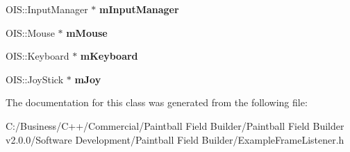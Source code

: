 \begin{DoxyCompactItemize}
\item 
\hypertarget{class_example_frame_listener_ad1263d99703452367b70e8917a3484ae}{
OIS::InputManager $\ast$ {\bfseries mInputManager}}
\label{class_example_frame_listener_ad1263d99703452367b70e8917a3484ae}

\item 
\hypertarget{class_example_frame_listener_a6cb185d298937b6da88d6032c16cc484}{
OIS::Mouse $\ast$ {\bfseries mMouse}}
\label{class_example_frame_listener_a6cb185d298937b6da88d6032c16cc484}

\item 
\hypertarget{class_example_frame_listener_a3ddc50f261d1ef5e42637b2196e24d77}{
OIS::Keyboard $\ast$ {\bfseries mKeyboard}}
\label{class_example_frame_listener_a3ddc50f261d1ef5e42637b2196e24d77}

\item 
\hypertarget{class_example_frame_listener_a04c86b80bdcf7dbd43d8c9c5993f067a}{
OIS::JoyStick $\ast$ {\bfseries mJoy}}
\label{class_example_frame_listener_a04c86b80bdcf7dbd43d8c9c5993f067a}

\end{DoxyCompactItemize}


The documentation for this class was generated from the following file:\begin{DoxyCompactItemize}
\item 
C:/Business/C++/Commercial/Paintball Field Builder/Paintball Field Builder v2.0.0/Software Development/Paintball Field Builder/ExampleFrameListener.h\end{DoxyCompactItemize}
